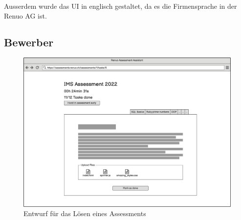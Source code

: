 Ausserdem wurde das UI in englisch gestaltet, da es die Firmensprache in der Renuo AG ist.

\subsection{Bewerber}
\begin{figure}[H]
    \centering
    \includegraphics[width=12cm]{images/mockups/candidate-solve-assessment.png}

    \caption{\label{fig:mockup-candidate-solve-assessment}Entwurf für das Lösen eines Assessments}
\end{figure}

